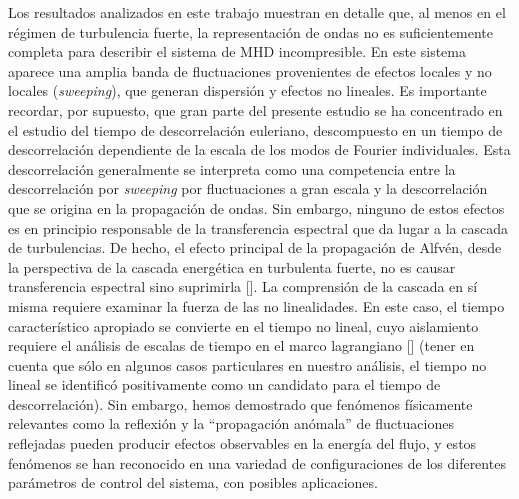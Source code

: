 Los resultados analizados en este trabajo muestran en detalle que, al
menos en el régimen de turbulencia fuerte, la representación de ondas
no es suficientemente completa para describir el sistema de MHD
incompresible. En este sistema aparece una amplia banda de
fluctuaciones provenientes de efectos locales y no locales
(\textit{sweeping}), que generan dispersión y efectos no lineales. Es
importante recordar, por supuesto, que gran parte del presente estudio
se ha concentrado en el estudio del tiempo de descorrelación euleriano,
descompuesto en un tiempo de descorrelación dependiente de la escala de
los modos de Fourier individuales. Esta descorrelación generalmente se
interpreta como una competencia entre la descorrelación por \textit{sweeping}
por fluctuaciones a gran escala y la descorrelación que se origina en
la propagación de ondas. Sin embargo, ninguno de estos efectos es en
principio responsable de la transferencia espectral que da lugar a la
cascada de turbulencias. De hecho, el efecto principal de la
propagación de Alfvén, desde la perspectiva de la cascada energética
en turbulenta fuerte, no es causar transferencia espectral sino
suprimirla [\cite{shebalin_1983_anisotropy}]. La comprensión de la
cascada en sí misma requiere examinar la fuerza de las no
linealidades. En este caso, el tiempo característico apropiado se
convierte en el tiempo no lineal, cuyo aislamiento requiere el
análisis de escalas de tiempo en el marco lagrangiano
[\cite{kraichnan_1964_kolmogorov}] (tener en cuenta que sólo en algunos
casos particulares en nuestro análisis, el tiempo no lineal se
identificó positivamente como un candidato para el tiempo de
descorrelación). Sin embargo, hemos demostrado que fenómenos
físicamente relevantes como la reflexión y la ``propagación anómala''
de fluctuaciones reflejadas pueden producir efectos observables en la
energía del flujo, y estos fenómenos se han reconocido en una variedad
de configuraciones de los diferentes parámetros de control del
sistema, con posibles aplicaciones.

